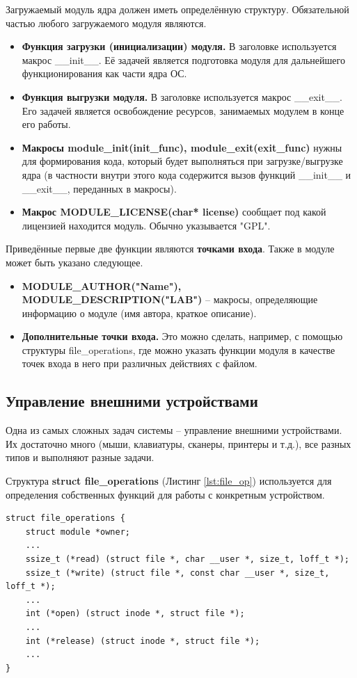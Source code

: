 Загружаемый модуль ядра должен иметь определённую структуру. Обязательной частью любого загружаемого модуля являются.
\begin{itemize}
	\item \textbf{Функция загрузки (инициализации) модуля.} В заголовке используется макрос \_\_init\_\_. Её задачей является подготовка модуля для дальнейшего функционирования как части ядра ОС.
	
	\item \textbf{Функция выгрузки модуля.} В заголовке используется макрос \_\_exit\_\_. Его задачей является освобождение ресурсов, занимаемых модулем в конце его работы. 
	
	\item \textbf{Макросы module\_init(init\_func), module\_exit(exit\_func)} нужны для формирования кода, который будет выполняться при загрузке/выгрузке ядра (в частности внутри этого кода содержится вызов функций \_\_init\_\_ и \_\_exit\_\_, переданных в макросы).
	
	\item \textbf{Макрос MODULE\_LICENSE(char* license)} сообщает под какой лицензией находится модуль. Обычно указывается "GPL".
\end{itemize}
Приведённые первые две функции являются \textbf{точками входа}. Также в модуле может быть указано следующее.
\begin{itemize}
	\item \textbf{MODULE\_AUTHOR("Name"), MODULE\_DESCRIPTION("LAB")} -- макросы, определяющие информацию о модуле (имя автора, краткое описание).
	
	\item \textbf{Дополнительные точки входа.} Это можно сделать, например, с помощью структуры file\_operations, где можно указать функции модуля в качестве точек входа в него при различных действиях с файлом. \newline
\end{itemize}

\subsection{Управление внешними устройствами}
Одна из самых сложных задач системы -- управление внешними устройствами. Их достаточно много (мыши, клавиатуры, сканеры, принтеры и т.д.), все разных типов и выполняют разные задачи.  

Структура \textbf{struct file\_operations} (Листинг \ref{lst:file_op}) используется для определения собственных функций для работы с конкретным устройством. 
\begin{lstlisting}[caption = {struct file\_operations}, label=lst:file_op]
struct file_operations {
	struct module *owner;
	...
	ssize_t (*read) (struct file *, char __user *, size_t, loff_t *);
	ssize_t (*write) (struct file *, const char __user *, size_t, loff_t *);
	...
	int (*open) (struct inode *, struct file *);
	...
	int (*release) (struct inode *, struct file *);
	...
}
\end{lstlisting}

